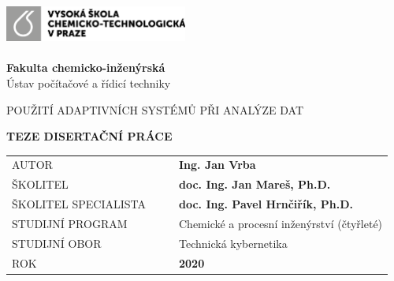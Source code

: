 \cleardoublepage
\thispagestyle{empty}
\noindent
\includegraphics[width=0.45\textwidth]{IMG/TOP/logoVSCHT_zakl_CB.png} \\
\vspace{10mm}
\\
{\Large \textbf{Fakulta  chemicko-inženýrská}
\\ [5mm]
Ústav počítačové a řídicí techniky}

\vspace{30mm}


\begin{spacing}{0.9}
\Huge\noindent POUŽITÍ ADAPTIVNÍCH SYSTÉMŮ PŘI ANALÝZE DAT\\ 
\end{spacing}
\vspace{20mm}

\noindent
{\Large \textbf{TEZE DISERTAČNÍ PRÁCE}} 

\vspace{10mm}

\begin{table}[!h]
\begin{tabular}{  l l |l  l }
\hspace{-0.5em}AUTOR & \hspace{0mm} & & {\Large \textbf{Ing. Jan Vrba}} \\ [5mm]
\hspace{-0.5em}ŠKOLITEL &  &  & \textbf{\large doc. Ing. Jan Mareš, Ph.D.}\\ [5mm]
\hspace{-0.5em}ŠKOLITEL  SPECIALISTA             &     &   & {\textbf{\large doc. Ing. Pavel Hrnčiřík, Ph.D. }} \\ [5mm]
\hspace{-0.5em}STUDIJNÍ PROGRAM &  &  & {\large Chemické a procesní inženýrství (čtyřleté)} \\ [5mm]
\hspace{-0.5em}STUDIJNÍ OBOR    & &   & {\large Technická kybernetika}\\ [5mm]
\hspace{-0.5em}ROK          &       &   & \textbf{2020} 
\end{tabular}


\end{table}

